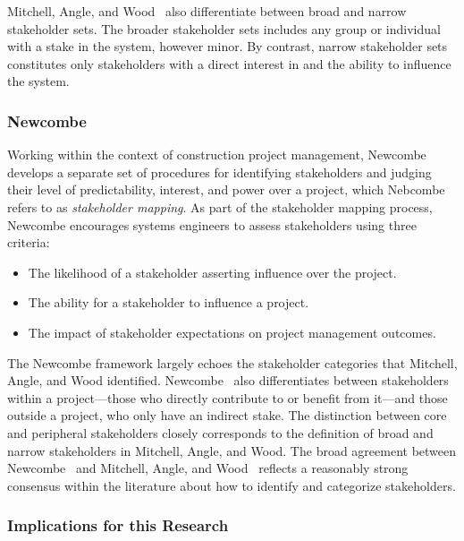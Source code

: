 Mitchell, Angle, and Wood~\cite{mitchell} also differentiate between broad and narrow stakeholder sets. The broader stakeholder sets includes any group or individual with a stake in the system, however minor. By contrast, narrow stakeholder sets constitutes only stakeholders with a direct interest in and the ability to influence the system.

\subsubsection{Newcombe}

Working within the context of construction project management, Newcombe~\cite{newcombe} develops a separate set of procedures for identifying stakeholders and judging their level of predictability, interest, and power over a project, which Nebcombe refers to as \emph{stakeholder mapping}. As part of the stakeholder mapping process, Newcombe encourages systems engineers to assess stakeholders using three criteria:

\begin{itemize}
    \item The likelihood of a stakeholder asserting influence over the project.
    \item The ability for a stakeholder to influence a project.
    \item The impact of stakeholder expectations on project management outcomes.
\end{itemize}

The Newcombe framework largely echoes the stakeholder categories that Mitchell, Angle, and Wood identified. Newcombe~\cite{newcombe} also differentiates between stakeholders within a project---those who directly contribute to or benefit from it---and those outside a project, who only have an indirect stake. The distinction between core and peripheral stakeholders closely corresponds to the definition of broad and narrow stakeholders in Mitchell, Angle, and Wood. The broad agreement between Newcombe~\cite{newcombe} and Mitchell, Angle, and Wood~\cite{mitchell} reflects a reasonably strong consensus within the literature about how to identify and categorize stakeholders.

\subsubsection{Implications for this Research}

